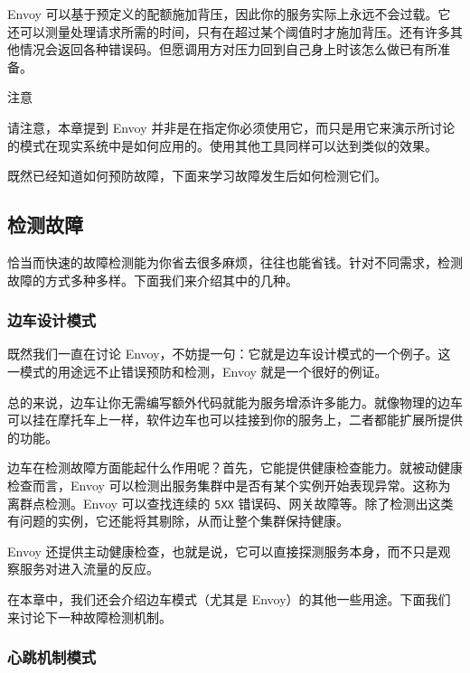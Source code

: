 \label{idx:334}
Envoy 可以基于预定义的配额施加背压，因此你的服务实际上永远不会过载。它还可以测量处理请求所需的时间，只有在超过某个阈值时才施加背压。还有许多其他情况会返回各种错误码。但愿调用方对压力回到自己身上时该怎么做已有所准备。

\begin{myNotic}{注意}

请注意，本章提到 Envoy 并非是在指定你必须使用它，而只是用它来演示所讨论的模式在现实系统中是如何应用的。使用其他工具同样可以达到类似的效果。
\end{myNotic}

既然已经知道如何预防故障，下面来学习故障发生后如何检测它们。

\subsection{检测故障}

\label{idx:335}
恰当而快速的故障检测能为你省去很多麻烦，往往也能省钱。针对不同需求，检测故障的方式多种多样。下面我们来介绍其中的几种。

\subsubsection{边车设计模式}

\label{idx:336}
既然我们一直在讨论 Envoy，不妨提一句：它就是边车设计模式的一个例子。这一模式的用途远不止错误预防和检测，Envoy 就是一个很好的例证。

\label{idx:337}
总的来说，边车让你无需编写额外代码就能为服务增添许多能力。就像物理的边车可以挂在摩托车上一样，软件边车也可以挂接到你的服务上，二者都能扩展所提供的功能。

\label{idx:338}
边车在检测故障方面能起什么作用呢？首先，它能提供健康检查能力。就被动健康检查而言，Envoy 可以检测出服务集群中是否有某个实例开始表现异常。这称为离群点检测。Envoy 可以查找连续的 \texttt{5XX} 错误码、网关故障等。除了检测出这类有问题的实例，它还能将其剔除，从而让整个集群保持健康。

Envoy 还提供主动健康检查，也就是说，它可以直接探测服务本身，而不只是观察服务对进入流量的反应。

\label{idx:339}
\label{idx:340}
在本章中，我们还会介绍边车模式（尤其是 Envoy）的其他一些用途。下面我们来讨论下一种故障检测机制。

\subsubsection{心跳机制模式}

